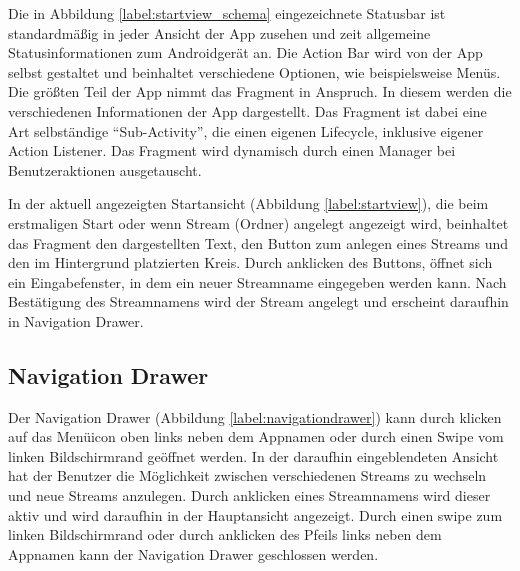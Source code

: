 Die in Abbildung \ref{label:startview_schema} eingezeichnete Statusbar ist standardmäßig in jeder Ansicht der App zusehen und zeit allgemeine Statusinformationen zum Androidgerät an. Die Action Bar wird von der App selbst gestaltet und beinhaltet verschiedene Optionen, wie beispielsweise Menüs. Die größten Teil der App nimmt das Fragment in Anspruch. In diesem werden die verschiedenen Informationen der App dargestellt. Das Fragment ist dabei eine Art selbständige \enquote{Sub-Activity}, die einen eigenen Lifecycle, inklusive eigener Action Listener.
Das Fragment wird dynamisch durch einen Manager bei Benutzeraktionen ausgetauscht.

In der aktuell angezeigten Startansicht (Abbildung \ref{label:startview}), die beim erstmaligen Start oder wenn Stream (Ordner) angelegt angezeigt wird, beinhaltet das Fragment den dargestellten Text, den Button zum anlegen eines Streams und den im Hintergrund platzierten Kreis. Durch anklicken des Buttons, öffnet sich ein Eingabefenster, in dem ein neuer Streamname eingegeben werden kann. Nach Bestätigung des Streamnamens wird der Stream angelegt und erscheint daraufhin in Navigation Drawer. 

\subsection{Navigation Drawer}

Der Navigation Drawer (Abbildung \ref{label:navigationdrawer}) kann durch klicken auf das Menüicon oben links neben dem Appnamen oder durch einen Swipe vom linken Bildschirmrand geöffnet werden.
In der daraufhin eingeblendeten Ansicht hat der Benutzer die Möglichkeit zwischen verschiedenen Streams zu wechseln und neue Streams anzulegen. Durch anklicken eines Streamnamens wird dieser aktiv und wird daraufhin in der Hauptansicht angezeigt. Durch einen swipe zum linken Bildschirmrand oder durch anklicken des Pfeils links neben dem Appnamen kann der Navigation Drawer geschlossen werden.

